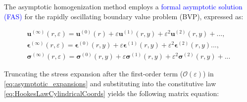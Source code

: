 The asymptotic homogenization method employs a \textcolor{blue}{formal asymptotic solution (FAS)} for the rapidly oscillating boundary value problem (BVP), expressed as:

\begin{equation}\label{eq:asymptotic_expansions}
    \begin{aligned}
        \mathbf{u}^{(\infty)}(r,\varepsilon)=\mathbf{u}^{(0)}(r)+\varepsilon \mathbf{u}^{(1)} (r,y)+\varepsilon^2 \mathbf{u}^{(2)}(r,y) + ...,\\
        \boldsymbol{\epsilon}^{(\infty)}(r,\varepsilon) = \boldsymbol{\epsilon}^{(0)}(r,y) + \varepsilon \boldsymbol{\epsilon}^{(1)}(r,y) +\varepsilon^2 \boldsymbol{\epsilon}^{(2)}(r,y) ...,\\
        \boldsymbol{\sigma}^{(\infty)}(r, \varepsilon) = \boldsymbol{\sigma}^{(0)}(r,y) + \varepsilon \boldsymbol{\sigma}^{(1)}(r,y) +\varepsilon^2 \boldsymbol{\sigma}^{(2)}(r,y) + ...
    \end{aligned}
\end{equation}

Truncating the stress expansion after the first-order term ($\mathcal{O}(\varepsilon)$) in \eqref{eq:asymptotic_expansions} and substituting into the constitutive law \eqref{eq:HookesLawCylindricalCoords} yields the following matrix equation:


